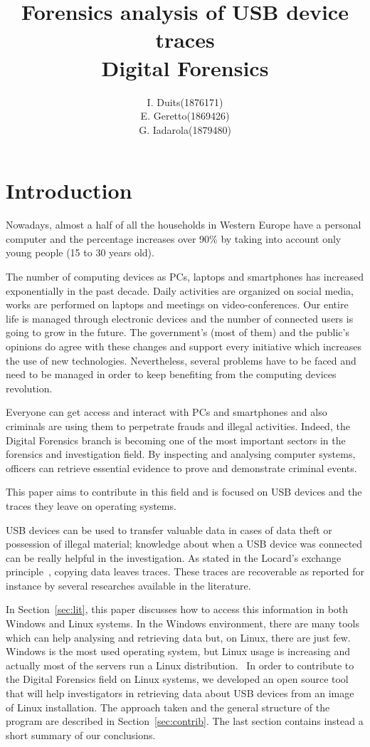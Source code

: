 \documentclass[a4paper]{article}
\title{Forensics analysis of USB device traces\\
\large Digital Forensics}
\author{
\begin{tabular}{>{\raggedleft}m{5cm}m{5cm}}
I. Duits & (1876171) \\
E. Geretto & (1869426) \\
G. Iadarola & (1879480) \\
\end{tabular}
}
\begin{document}
\maketitle

\section{Introduction}
Nowadays, almost a half of all the households in Western Europe have a personal
computer and the percentage increases over 90\% by taking into account only
young people (15 to 30 years old).

The number of computing devices as PCs, laptops and smartphones has increased
exponentially in the past decade. Daily activities are organized on social
media, works are performed on laptops and meetings on video-conferences. Our
entire life is managed through electronic devices and the number of connected
users is going to grow in the future. The government's (most of them) and the
public's opinions do agree with these changes and support every initiative
which increases the use of new technologies. Nevertheless, several problems have
to be faced and need to be managed in order to keep benefiting from the
computing devices revolution.

Everyone can get access and interact with PCs and smartphones and also criminals
are using them to perpetrate frauds and illegal activities. Indeed, the Digital
Forensics branch is becoming one of the most important sectors in the forensics
and investigation field. By inspecting and analysing computer systems, officers
can retrieve essential evidence to prove and demonstrate criminal events.

This paper aims to contribute in this field and is focused on USB devices and
the traces they leave on operating systems.

USB devices can be used to transfer valuable data in cases of data theft or
possession of illegal material; knowledge about when a USB device was connected
can be really helpful in the investigation. As stated in the Locard's exchange
principle~\cite{locard2008locard}, copying data leaves traces. These traces are
recoverable as reported for instance by several researches available in the
literature.~\cite{Tanushree12,Abhijeet14}

In Section~\ref{sec:lit}, this paper discusses how to access this information
in both Windows and Linux systems. In the Windows environment, there are many
tools which can help analysing and retrieving data but, on Linux, there are
just few. Windows is the most used operating system, but Linux usage is
increasing and actually most of the servers run a Linux
distribution.~\cite{InternetServer} In order to contribute to the
Digital Forensics field on Linux systems, we developed an open source tool that
will help investigators in retrieving data about USB devices from an image of
Linux installation. The approach taken and the general structure of the program
are described in Section~\ref{sec:contrib}. The last section contains instead a
short summary of our conclusions.
\end{document}
